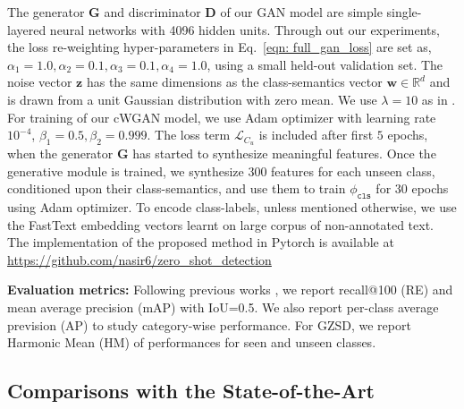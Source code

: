 \documentclass[runningheads]{llncs}
\begin{document}
The generator $\mathbf{G}$ and discriminator $\mathbf{D}$ of our GAN model are simple single-layered neural networks with {4096} hidden units. Through out our experiments, the loss re-weighting hyper-parameters in Eq.~\ref{eqn: full_gan_loss} are set as, $\alpha_1=1.0,  \alpha_2=0.1, \alpha_3=0.1, \alpha_4=1.0$, using a small held-out validation set. The noise vector $\mathbf{z}$ has the same dimensions as the class-semantics vector $\mathbf{w} \in \mathbb{R}^d$ and is drawn from a unit Gaussian distribution with zero mean. We use $\lambda=10$ as in \cite{gulrajani2017improved}. For training of our  cWGAN model, we use Adam optimizer with learning rate $10^{-4}$, $\beta_1=0.5, \beta_2=0.999$. The loss term $\mathcal{L}_{C_u}$ is included after first $5$ epochs, when the generator $\mathbf{G}$ has started to synthesize meaningful features. Once the generative module is trained, we synthesize 300 features for each unseen class, conditioned upon their class-semantics, and use them to train $\phi_{\texttt{cls}}$ for {30} epochs using {Adam} optimizer. To encode class-labels, unless mentioned otherwise, we use the FastText \cite{mikolov2018advances} embedding vectors learnt on large corpus of non-annotated text. The implementation of the proposed method in Pytorch is available at \url{https://github.com/nasir6/zero_shot_detection}

\noindent\textbf{Evaluation metrics:} Following previous works \cite{rahman2018polarity,bansal2018zero}, we report recall@100 (RE) and mean average precision (mAP) with IoU=0.5. We also report per-class average prevision (AP) to study category-wise performance. For GZSD, we report Harmonic Mean (HM) of performances for seen and unseen classes. 







\subsection{Comparisons with the State-of-the-Art}
\end{document}
